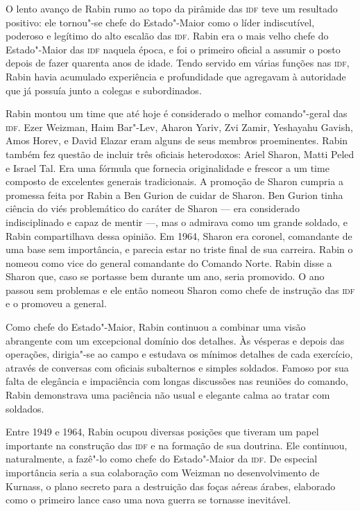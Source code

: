 O lento avanço de Rabin rumo ao topo da pirâmide das \textsc{idf} teve um
resultado positivo: ele tornou"-se chefe do Estado"-Maior como o líder
indiscutível, poderoso e legítimo do alto escalão das \textsc{idf}. Rabin era o
mais velho chefe do Estado"-Maior das \textsc{idf} naquela época, e foi o primeiro
oficial a assumir o posto depois de fazer quarenta anos de idade. Tendo servido em várias
funções nas \textsc{idf}, Rabin havia acumulado experiência e profundidade que
agregavam à autoridade que já possuía junto a colegas e subordinados.

Rabin montou um time que até hoje é considerado o melhor comando"-geral
das \textsc{idf}. Ezer Weizman, Haim Bar"-Lev, Aharon Yariv, Zvi Zamir, Yeshayahu
Gavish, Amos Horev, e David Elazar eram alguns de seus membros proeminentes. Rabin também fez
questão de incluir três oficiais heterodoxos: Ariel Sharon, Matti Peled
e Israel Tal. Era uma fórmula que fornecia originalidade e frescor a um
time composto de excelentes generais tradicionais. A promoção de Sharon
cumpria a promessa feita por Rabin a Ben Gurion de cuidar de Sharon. Ben
Gurion tinha ciência do viés problemático do caráter de Sharon --- era
considerado indisciplinado e capaz de mentir ---, mas o admirava como um
grande soldado, e Rabin compartilhava dessa opinião. Em 1964,
Sharon era coronel, comandante de uma base sem importância, e parecia
estar no triste final de sua carreira. Rabin o nomeou como vice do
general comandante do Comando Norte. Rabin disse a Sharon que, caso se
portasse bem durante um ano, seria promovido. O ano passou sem problemas e
ele então nomeou Sharon como chefe de instrução das \textsc{idf} e o promoveu a
general.

Como chefe do Estado"-Maior, Rabin continuou a combinar uma visão
abrangente com um excepcional domínio dos detalhes. Às vésperas e depois
das operações, dirigia"-se ao campo e estudava os mínimos detalhes de cada
exercício, através de conversas com oficiais subalternos e simples
soldados. Famoso por sua falta de elegância e impaciência com longas
discussões nas reuniões do comando, Rabin demonstrava uma paciência não
usual e elegante calma ao tratar com soldados.

Entre 1949 e 1964, Rabin ocupou diversas posições que tiveram um papel
importante na construção das \textsc{idf} e na formação de sua doutrina. Ele
continuou, naturalmente, a fazê"-lo como chefe do Estado"-Maior da \textsc{idf}. De
especial importância seria a sua colaboração com Weizman no
desenvolvimento de Kurnass, o plano secreto para a destruição das foças
aéreas árabes, elaborado como o primeiro lance caso uma nova guerra se
tornasse inevitável.

